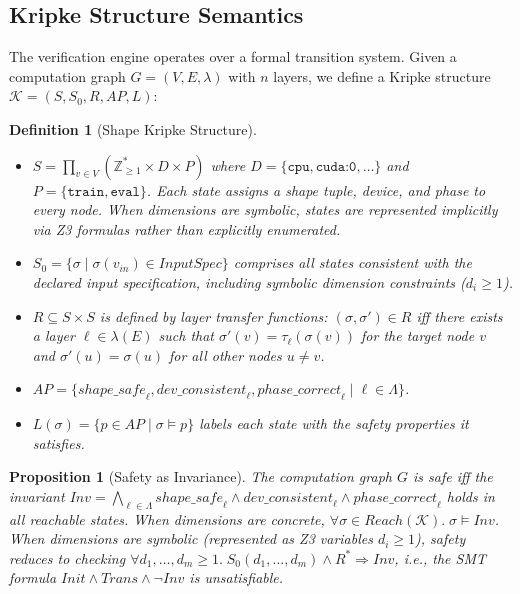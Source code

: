 \documentclass[11pt]{article}
\newtheorem{definition}[theorem]{Definition}
\newtheorem{proposition}[theorem]{Proposition}
\begin{document}
\subsection{Kripke Structure Semantics}\label{sec:kripke}

The verification engine operates over a formal transition system.
Given a computation graph $G = (V, E, \lambda)$ with $n$ layers,
we define a Kripke structure $\mathcal{K} = (S, S_0, R, \mathit{AP}, L)$:

\begin{definition}[Shape Kripke Structure]\label{def:kripke}
\begin{itemize}[leftmargin=2em]
  \item $S = \prod_{v \in V} (\mathbb{Z}_{\geq 1}^* \times D \times P)$
    where $D = \{\texttt{cpu}, \texttt{cuda:0}, \ldots\}$ and
    $P = \{\texttt{train}, \texttt{eval}\}$.  Each state assigns
    a shape tuple, device, and phase to every node.
    When dimensions are symbolic, states are represented implicitly
    via Z3 formulas rather than explicitly enumerated.
  \item $S_0 = \{\sigma \mid \sigma(v_{\mathit{in}}) \in \mathit{InputSpec}\}$
    comprises all states consistent with the declared input specification,
    including symbolic dimension constraints ($d_i \geq 1$).
  \item $R \subseteq S \times S$ is defined by layer transfer functions:
    $(\sigma, \sigma') \in R$ iff there exists a layer $\ell \in \lambda(E)$ such that
    $\sigma'(v) = \tau_{\ell}(\sigma(v))$ for the target node $v$ and
    $\sigma'(u) = \sigma(u)$ for all other nodes $u \neq v$.
  \item $\mathit{AP} = \{\mathit{shape\_safe}_\ell, \mathit{dev\_consistent}_\ell,
    \mathit{phase\_correct}_\ell \mid \ell \in \Lambda\}$.
  \item $L(\sigma) = \{p \in \mathit{AP} \mid \sigma \models p\}$ labels
    each state with the safety properties it satisfies.
\end{itemize}
\end{definition}

\begin{proposition}[Safety as Invariance]
The computation graph $G$ is safe iff the invariant
$\mathit{Inv} = \bigwedge_{\ell \in \Lambda}
\mathit{shape\_safe}_\ell \land \mathit{dev\_consistent}_\ell
\land \mathit{phase\_correct}_\ell$
holds in all reachable states.
When dimensions are concrete, $\forall \sigma \in
\mathit{Reach}(\mathcal{K}). \; \sigma \models \mathit{Inv}$.
When dimensions are symbolic (represented as Z3 variables $d_i \geq 1$),
safety reduces to checking $\forall d_1, \ldots, d_m \geq 1.\;
S_0(d_1, \ldots, d_m) \land R^* \Rightarrow \mathit{Inv}$,
i.e., the SMT formula $\mathit{Init} \land \mathit{Trans} \land \neg \mathit{Inv}$
is unsatisfiable.
\end{proposition}
\end{document}
